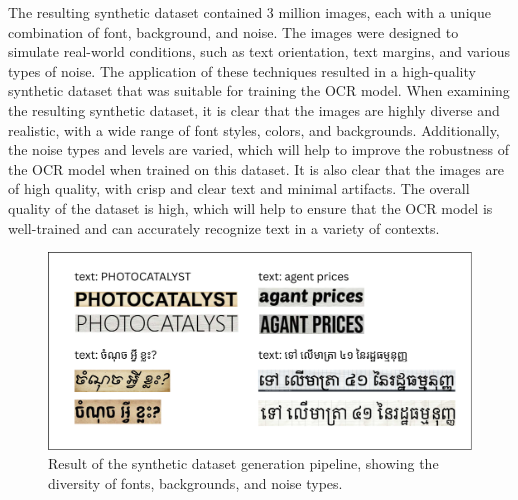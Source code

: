 The resulting synthetic dataset contained 3 million images, each with a unique 
combination of font, background, and noise. The images were designed to simulate 
real-world conditions, such as text orientation, text margins, and various types of 
noise. The application of these techniques resulted in a high-quality synthetic dataset 
that was suitable for training the OCR model. When examining the resulting synthetic 
dataset, it is clear that the images are highly diverse and realistic, with a wide range 
of font styles, colors, and backgrounds. Additionally, the noise types and levels are 
varied, which will help to improve the robustness of the OCR model when trained on 
this dataset. It is also clear that the images are of high quality, with crisp and clear 
text and minimal artifacts. The overall quality of the dataset is high, which will help 
to ensure that the OCR model is well-trained and can accurately recognize text in a 
variety of contexts.

\begin{figure}[ht]
    \centering
    \includegraphics[width=\textwidth]{figures/resutl_synthetic_dataset.png}
    \caption{Result of the synthetic dataset generation pipeline, showing the diversity of fonts, backgrounds, and noise types.}
    \label{fig:result_synthetic_dataset}
\end{figure}

